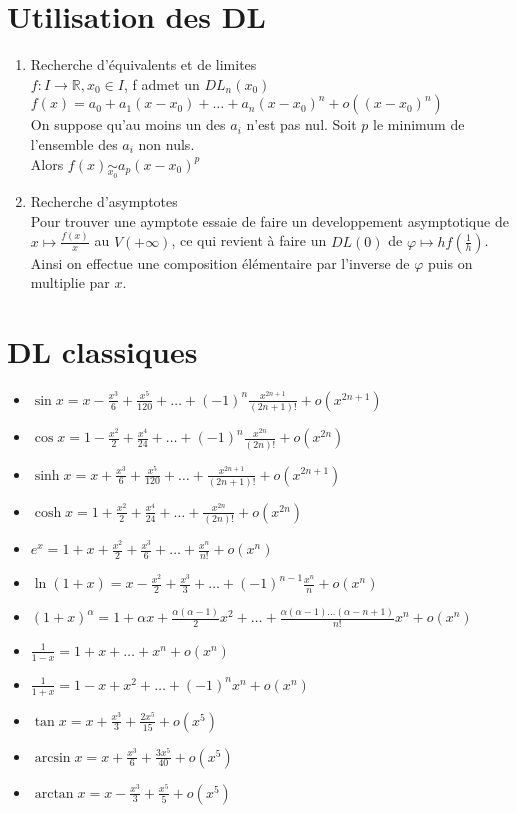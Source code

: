\documentclass[fleqn]{article}
\theoremstyle{definition} \newtheorem*{defi}{D\'efinition}
\theoremstyle{definition} \newtheorem*{theo}{Th\'eor\`eme}
\theoremstyle{definition} \newtheorem*{prop}{Propri\'et\'e}
\theoremstyle{definition} \newtheorem*{coro}{Corollaire}
\theoremstyle{remark} \newtheorem*{rqs}{Remarques}
\begin{document}
\section{Utilisation des DL}
\begin{enumerate}
	\item Recherche d'\'equivalents et de limites \\
		$f: I \rightarrow \mathbb{R}, x_0 \in I$, f admet un $DL_n(x_0)$ \\
		$f(x) =  a_0 + a_1(x-x_0) + \hdots + a_n(x-x_0)^n + o((x-x_0)^n)$ \\
		On suppose qu'au moins un des $a_i$ n'est pas nul. Soit $p$ le minimum de l'ensemble des $a_i$ non nuls. \\
		Alors $f(x) \underset{x_0}{\sim} a_p(x-x_0)^p$
	\item Recherche d'asymptotes \\
		Pour trouver une aymptote essaie de faire un developpement asymptotique de $x \mapsto \frac{f(x)}{x}$ au $V(+\infty)$, ce qui revient
		\`a faire un $DL(0)$ de $\varphi \mapsto h f(\frac{1}{h})$. \\
		Ainsi on effectue une composition \'el\'ementaire par l'inverse de $\varphi$ puis on multiplie par $x$.
\end{enumerate}

\section{DL classiques}
\begin{itemize}
	\item $\sin x = x - \frac{x^3}{6} + \frac{x^5}{120} + \hdots + (-1)^n \frac{x^{2n+1}}{(2n+1)!} + o(x^{2n+1})$
	\item $\cos x = 1 - \frac{x^2}{2} + \frac{x^4}{24} + \hdots + (-1)^n \frac{x^{2n}}{(2n)!} + o(x^{2n})$
	\item $\sinh x = x + \frac{x^3}{6} + \frac{x^5}{120} + \hdots + \frac{x^{2n+1}}{(2n+1)!} + o(x^{2n+1})$
	\item $\cosh x = 1 + \frac{x^2}{2} + \frac{x^4}{24} + \hdots + \frac{x^{2n}}{(2n)!} + o(x^{2n})$
	\item $e^x = 1 + x + \frac{x^2}{2} + \frac{x^3}{6} + \hdots + \frac{x^n}{n!} + o(x^n)$
	\item $\ln(1+x) = x - \frac{x^2}{2} + \frac{x^3}{3} + \hdots + (-1)^{n-1} \frac{x^n}{n} + o(x^n)$
	\item $(1+x)^{\alpha} = 1 + \alpha x + \frac{\alpha(\alpha -1)}{2} x^2 + \hdots + \frac{\alpha(\alpha-1)\hdots(\alpha-n+1)}{n!} x^n
		+ o(x^n)$
	\item $\frac{1}{1-x} = 1 + x + \hdots + x^n + o(x^n)$
	\item $\frac{1}{1+x} = 1 - x + x^2 + \hdots + (-1)^n x^n + o(x^n)$
	\item $\tan x = x + \frac{x^3}{3} + \frac{2x^5}{15} + o(x^5)$
	\item $\arcsin x = x + \frac{x^3}{6} + \frac{3x^5}{40} + o(x^5)$
	\item $\arctan x = x - \frac{x^3}{3} + \frac{x^5}{5} + o(x^5)$
\end{itemize}
\end{document}
